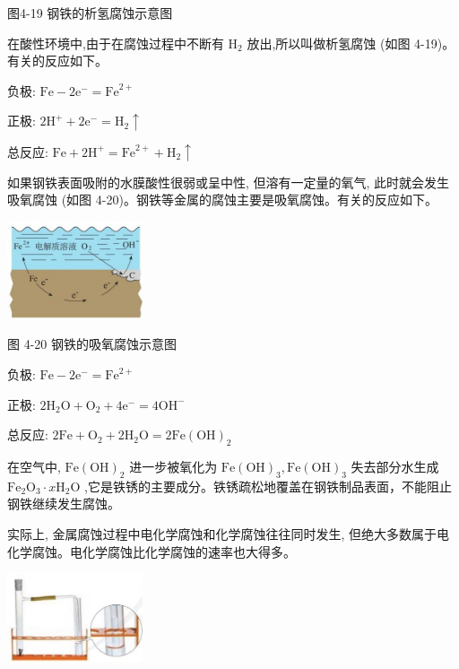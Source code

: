 \documentclass[10pt]{article}
\begin{document}
图4-19 钢铁的析氢腐蚀示意图

在酸性环境中,由于在腐蚀过程中不断有 \({\mathrm{H}}_{2}\) 放出,所以叫做析氢腐蚀 (如图 4-19)。有关的反应如下。

负极: \(\mathrm{{Fe}} - 2{\mathrm{e}}^{ - } = {\mathrm{{Fe}}}^{2 + }\)

正极: \(2{\mathrm{H}}^{ + } + 2{\mathrm{e}}^{ - } = {\mathrm{H}}_{2} \uparrow\)

总反应: \(\mathrm{{Fe}} + 2{\mathrm{H}}^{ + } = {\mathrm{{Fe}}}^{2 + } + {\mathrm{H}}_{2} \uparrow\)

如果钢铁表面吸附的水膜酸性很弱或呈中性, 但溶有一定量的氧气, 此时就会发生吸氧腐蚀 (如图 4-20)。钢铁等金属的腐蚀主要是吸氧腐蚀。有关的反应如下。

\begin{center}
\includegraphics[max width=0.3\textwidth]{images/0190da9d-8bfd-732f-bc2c-0b21d0f13b91_117_821180.jpg}
\end{center}

图 4-20 钢铁的吸氧腐蚀示意图

负极: \(\mathrm{{Fe}} - 2{\mathrm{e}}^{ - } = {\mathrm{{Fe}}}^{2 + }\)

正极: \(2{\mathrm{H}}_{2}\mathrm{O} + {\mathrm{O}}_{2} + 4{\mathrm{e}}^{ - } = 4{\mathrm{{OH}}}^{ - }\)

总反应: \(2\mathrm{{Fe}} + {\mathrm{O}}_{2} + 2{\mathrm{H}}_{2}\mathrm{O} = 2\mathrm{{Fe}}{\left( \mathrm{{OH}}\right) }_{2}\)

在空气中, \(\mathrm{{Fe}}{\left( \mathrm{{OH}}\right) }_{2}\) 进一步被氧化为 \(\mathrm{{Fe}}{\left( \mathrm{{OH}}\right) }_{3},\mathrm{{Fe}}{\left( \mathrm{{OH}}\right) }_{3}\) 失去部分水生成 \({\mathrm{{Fe}}}_{2}{\mathrm{O}}_{3} \cdot x{\mathrm{H}}_{2}\mathrm{O}\) ,它是铁锈的主要成分。铁锈疏松地覆盖在钢铁制品表面，不能阻止钢铁继续发生腐蚀。

实际上, 金属腐蚀过程中电化学腐蚀和化学腐蚀往往同时发生, 但绝大多数属于电化学腐蚀。电化学腐蚀比化学腐蚀的速率也大得多。

\begin{center}
\includegraphics[max width=0.3\textwidth]{images/0190da9d-8bfd-732f-bc2c-0b21d0f13b91_117_626357.jpg}
\end{center}
\end{document}
